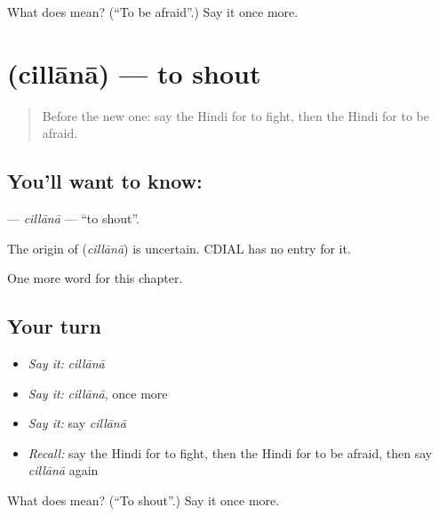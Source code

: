 \begin{tcolorbox}[breakable,colback=teal!4,colframe=teal!35!black,title={Before you move on}]
What does  mean? (\textquotedblleft{}To be afraid\textquotedblright{}.) Say it once more.
\end{tcolorbox}
\section[\texorpdfstring{\hi{चिल्लाना} (cillānā)}{चिल्लाना (cillānā)}]{ (cillānā) — to shout}

\label{lesson:HI-C178-cillana}



\begin{quote}
Before the new one: say the Hindi for to fight, then the Hindi for to be afraid.
\end{quote}

\subsection*{You'll want to know: }
\textbf{} — \emph{cillānā} — \textquotedblleft{}to shout\textquotedblright{}.

\begin{cousinweb}
The origin of \textbf{} (\emph{cillānā}) is uncertain. CDIAL has no entry for it.
\end{cousinweb}

\begin{grammarlens}[title={What you've built}]
One more word for this chapter.
\end{grammarlens}

\subsection*{Your turn}
\begin{itemize}
\raggedright
  \item \emph{Say it:} \emph{cillānā}
  \item \emph{Say it:} \emph{cillānā}, once more
  \item \emph{Say it:} say \emph{cillānā}
  \item \emph{Recall:} say the Hindi for to fight, then the Hindi for to be afraid, then say \emph{cillānā} again
\end{itemize}

\begin{tcolorbox}[breakable,colback=teal!4,colframe=teal!35!black,title={Before you move on}]
What does  mean? (\textquotedblleft{}To shout\textquotedblright{}.) Say it once more.
\end{tcolorbox}
